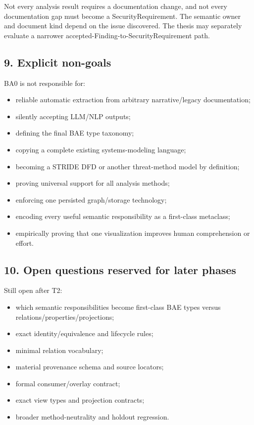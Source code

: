 \documentclass[
  10pt,
  a4paper,
]{article}
\providecommand{\tightlist}{%
  \setlength{\itemsep}{0pt}\setlength{\parskip}{0pt}}
\begin{document}
Not every analysis result requires a documentation change, and not every
documentation gap must become a SecurityRequirement. The semantic owner
and document kind depend on the issue discovered. The thesis may
separately evaluate a narrower accepted-Finding-to-SecurityRequirement
path.

\subsection{9. Explicit non-goals}\label{9-explicit-non-goals}

BA0 is not responsible for:

\begin{itemize}
\tightlist
\item
  reliable automatic extraction from arbitrary narrative/legacy
  documentation;
\item
  silently accepting LLM/NLP outputs;
\item
  defining the final BAE type taxonomy;
\item
  copying a complete existing systems-modeling language;
\item
  becoming a STRIDE DFD or another threat-method model by definition;
\item
  proving universal support for all analysis methods;
\item
  enforcing one persisted graph/storage technology;
\item
  encoding every useful semantic responsibility as a first-class
  metaclass;
\item
  empirically proving that one visualization improves human
  comprehension or effort.
\end{itemize}

\subsection{10. Open questions reserved for later
phases}\label{10-open-questions-reserved-for-later-phases}

Still open after T2:

\begin{itemize}
\tightlist
\item
  which semantic responsibilities become first-class BAE types versus
  relations/properties/projections;
\item
  exact identity/equivalence and lifecycle rules;
\item
  minimal relation vocabulary;
\item
  material provenance schema and source locators;
\item
  formal consumer/overlay contract;
\item
  exact view types and projection contracts;
\item
  broader method-neutrality and holdout regression.
\end{itemize}
\end{document}
